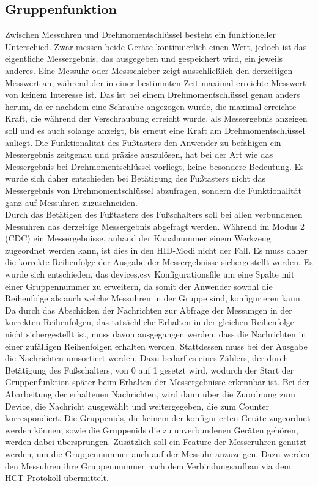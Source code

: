 \subsection{Gruppenfunktion}
Zwischen Messuhren und Drehmomentschlüssel besteht ein funktioneller Unterschied. Zwar messen beide Geräte kontinuierlich einen Wert, jedoch ist das eigentliche Messergebnis, das ausgegeben und gespeichert wird, ein jeweils anderes. Eine Messuhr oder Messschieber zeigt ausschließlich den derzeitigen Messwert an, während der in einer bestimmten Zeit maximal erreichte Messwert von keinem Interesse ist. Das ist bei einem Drehmomentschlüssel genau anders herum, da er nachdem eine Schraube angezogen wurde, die maximal erreichte Kraft, die während der Verschraubung erreicht wurde, als Messergebnis anzeigen soll und es auch solange anzeigt, bis erneut eine Kraft am Drehmomentschlüssel anliegt. Die Funktionalität des Fußtasters den Anwender zu befähigen ein Messergebnis zeitgenau und präzise auszulösen, hat bei der Art wie das Messergebnis bei Drehmomentschlüssel vorliegt, keine besondere Bedeutung. Es wurde sich daher entschieden bei Betätigung des Fußtasters nicht das Messergebnis von Drehmomentschlüssel abzufragen, sondern die Funktionalität ganz auf Messuhren zuzuschneiden.\\
Durch das Betätigen des Fußtasters des Fußschalters soll bei allen verbundenen Messuhren das derzeitige Messergebnis abgefragt werden. Während im Modus 2 (CDC) ein Messergebnisse, anhand der Kanalnummer einem Werkzeug zugeordnet werden kann, ist dies in den \ac{HID}-Modi nicht der Fall. Es muss daher die korrekte Reihenfolge der Ausgabe der Messergebnisse sichergestellt werden. Es wurde sich entschieden, das devices.csv Konfigurationsfile um eine Spalte mit einer Gruppennummer zu erweitern, da somit der Anwender sowohl die Reihenfolge als auch welche Messuhren in der Gruppe sind, konfigurieren kann. Da durch das Abschicken der Nachrichten zur Abfrage der Messungen in der korrekten Reihenfolgen, das tatsächliche Erhalten in der gleichen Reihenfolge nicht sichergestellt ist, muss davon ausgegangen werden, dass die Nachrichten in einer zufälligen Reihenfolgen erhalten werden. Stattdessen muss bei der Ausgabe die Nachrichten umsortiert werden. Dazu bedarf es eines Zählers, der durch Betätigung des Fußschalters, von 0 auf 1 gesetzt wird, wodurch der Start der Gruppenfunktion später beim Erhalten der Messergebnisse erkennbar ist. Bei der Abarbeitung der erhaltenen Nachrichten, wird dann über die Zuordnung zum Device, die Nachricht ausgewählt und weitergegeben, die zum Counter korrespondiert. Die Gruppenids, die keinem der konfigurierten Geräte zugeordnet werden können, sowie die Gruppenids die zu unverbundenen Geräten gehören, werden dabei übersprungen. Zusätzlich soll ein Feature der Messeruhren genutzt werden, um die Gruppennummer auch auf der Messuhr anzuzeigen. Dazu werden den Messuhren ihre Gruppennummer nach dem Verbindungsaufbau via dem \ac{HCT}-Protokoll übermittelt.\\
